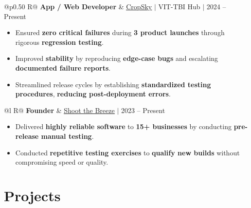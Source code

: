 \documentclass[a4paper,10pt]{article}
\newcommand{\ulink}[2]{\href{#1}{\uline{#2}}}
\newcommand{\subheading}[1]{{\color[HTML]{0A0A0A}\fontsize{12}{14}\selectfont\bfseries #1}}
\newcommand{\meta}[1]{{\color[HTML]{5C5C5C}\fontsize{10.5}{12.5}\selectfont #1}}
\begin{document}
\begin{tabularx}{\linewidth}{@{}p{0.50\linewidth} R@{}}
\subheading{App / Web Developer} & \meta{\ulink{https://sites.google.com/view/cropsky/home}{CropSky} $|$ VIT-TBI Hub $|$ 2024 -- Present}
\end{tabularx}
\begin{itemize}[nosep, leftmargin=1.5em, itemsep=1pt, topsep=2pt]
  \item {\color[HTML]{0A0A0A}\fontsize{11}{14}\selectfont Ensured \textbf{zero critical failures} during \textbf{3 product launches} through rigorous \textbf{regression testing}.}
  \item {\color[HTML]{0A0A0A}\fontsize{11}{14}\selectfont Improved \textbf{stability} by reproducing \textbf{edge-case bugs} and escalating \textbf{documented failure reports}.}
  \item {\color[HTML]{0A0A0A}\fontsize{11}{14}\selectfont Streamlined release cycles by establishing \textbf{standardized testing procedures}, \textbf{reducing post-deployment errors}.}
\end{itemize}

\vspace{2pt}

\begin{tabularx}{\linewidth}{@{}l R@{}}
\subheading{Founder} & \meta{\ulink{https://shoot-the-breeze.vercel.app}{Shoot the Breeze} $|$ 2023 -- Present}
\end{tabularx}
\begin{itemize}[nosep, leftmargin=1.5em, itemsep=1pt, topsep=2pt]
  \item {\color[HTML]{0A0A0A}\fontsize{11}{14}\selectfont Delivered \textbf{highly reliable software} to \textbf{15+ businesses} by conducting \textbf{pre-release manual testing}.}
  \item {\color[HTML]{0A0A0A}\fontsize{11}{14}\selectfont Conducted \textbf{repetitive testing exercises} to \textbf{qualify new builds} without compromising speed or quality.}
\end{itemize}

\vspace{2pt}

\section{Projects}
\vspace{2pt}
\end{document}
